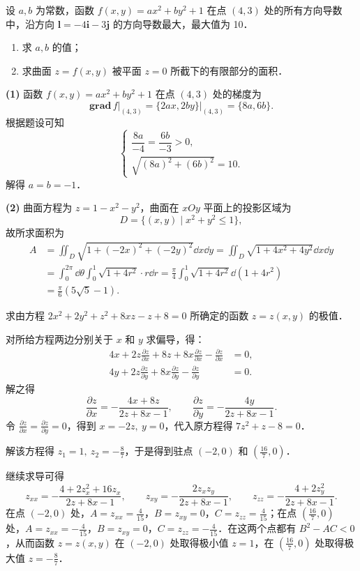 设 $a,b$ 为常数，函数 $f(x,y)=ax^2+by^2+1$ 在点 $(4,3)$ 处的所有方向导数中，沿方向 $\mathbf{l}=-4\mathbf{i}-3\mathbf{j}$ 的方向导数最大，最大值为 10．
\begin{enumerate}
  \item 求 $a,b$ 的值；
  \item 求曲面 $z=f(x,y)$ 被平面 $z=0$ 所截下的有限部分的面积．
\end{enumerate}
\begin{solution}
\textbf{(1)} 函数 $f(x,y)=ax^2+by^2+1$ 在点 $(4,3)$ 处的梯度为
\[
\mathbf{grad}\,f\big|_{(4,3)}=\{2ax,2by\}\big|_{(4,3)}=\{8a,6b\}.
\]
根据题设可知
\[
\begin{cases}
\dfrac{8a}{-4}=\dfrac{6b}{-3}>0,\\[2mm]
\sqrt{(8a)^2+(6b)^2}=10.
\end{cases}
\]
解得 $a=b=-1$．

\textbf{(2)} 曲面方程为 $z=1-x^2-y^2$，曲面在 $xOy$ 平面上的投影区域为
\[
D=\{(x,y)\mid x^2+y^2\le 1\},
\]
故所求面积为
\begin{align*}
A&=\iint_D\sqrt{1+(-2x)^2+(-2y)^2}\dd x\dd y=\iint_D\sqrt{1+4x^2+4y^2}\dd x\dd y\\
&=\int_0^{2\pi}\dd\theta\int_0^1\sqrt{1+4r^2}\cdot r\dd r=\frac{\pi}{4}\int_0^1\sqrt{1+4r^2}\dd(1+4r^2)\\
&=\frac{\pi}{6}\left(5\sqrt{5}-1\right).
\end{align*}
\end{solution}

求由方程 $2x^2+2y^2+z^2+8xz-z+8=0$ 所确定的函数 $z=z(x,y)$ 的极值．
\begin{solution}
对所给方程两边分别关于 $x$ 和 $y$ 求偏导，得：
\begin{align*}
4x+2z\frac{\partial z}{\partial x}+8z+8x\frac{\partial z}{\partial x}-\frac{\partial z}{\partial x}&=0,\\
4y+2z\frac{\partial z}{\partial y}+8x\frac{\partial z}{\partial y}-\frac{\partial z}{\partial y}&=0.
\end{align*}
解之得
\[
\frac{\partial z}{\partial x}=-\frac{4x+8z}{2z+8x-1},\qquad
\frac{\partial z}{\partial y}=-\frac{4y}{2z+8x-1}.
\]
令 $\frac{\partial z}{\partial x}=\frac{\partial z}{\partial y}=0$，得到 $x=-2z,\ y=0$，代入原方程得 $7z^2+z-8=0$．

解该方程得 $z_1=1,\ z_2=-\frac{8}{7}$，于是得到驻点 $(-2,0)$ 和 $\left(\frac{16}{7},0\right)$．

继续求导可得
\[
z_{xx}=-\frac{4+2z_x^2+16z_x}{2z+8x-1},\qquad
z_{xy}=-\frac{2z_xz_y}{2z+8x-1},\qquad
z_{zz}=-\frac{4+2z_y^2}{2z+8x-1}.
\]
在点 $(-2,0)$ 处，$A=z_{xx}=\frac{4}{15}$，$B=z_{xy}=0$，$C=z_{zz}=\frac{4}{15}$；在点 $\left(\frac{16}{7},0\right)$ 处，$A=z_{xx}=-\frac{4}{15}$，$B=z_{xy}=0$，$C=z_{zz}=-\frac{4}{15}$．在这两个点都有 $B^2-AC<0$，从而函数 $z=z(x,y)$ 在 $(-2,0)$ 处取得极小值 $z=1$，在 $\left(\frac{16}{7},0\right)$ 处取得极大值 $z=-\frac{8}{7}$．
\end{solution}

